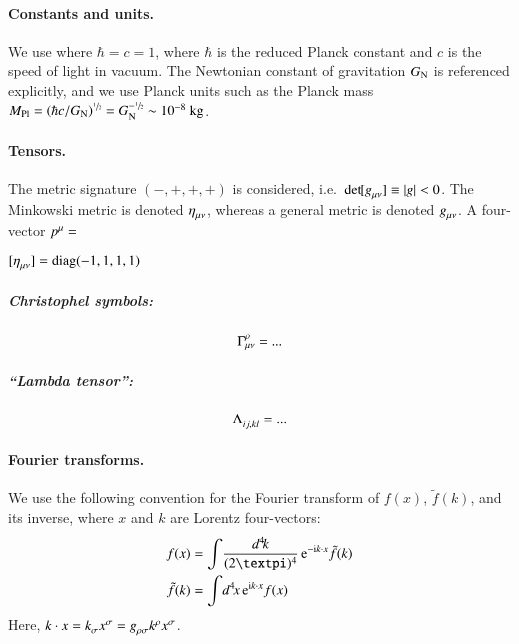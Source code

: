 


\paragraph{Constants and units.} %
We use  where $\hbar = c = 1$, where $\hbar$ is the reduced Planck constant and $c$ is the speed of light in vacuum. The Newtonian constant of gravitation $G_\mathrm{N}$ is referenced explicitly, and we use Planck units such as the Planck mass $M_{\mathrm{Pl}} = \left( \hbar c /G_\mathrm{N} \right)^{\sfrac{1}{2}} = G_\mathrm{N}^{-\sfrac{1}{2}} \sim 10^{-8} ~\mathrm{kg}$. 
%

\paragraph{Tensors.} %
The metric signature $(-,+,+,+)$ is considered, i.e.~$\det~\!\![g\indices{_{\mu\nu}}] \equiv \abs{g} < 0 $. The Minkowski metric is denoted $\eta\indices{_{\mu\nu}}$, whereas a general metric is denoted $g\indices{_{\mu\nu}}$. A four-vector $p\indices{^{\mu}} = $

$[\eta\loind{\mu\nu}] = \text{diag}(-1, 1, 1, 1)$

\subparagraph[Gamma]{Christophel symbols:} %
\begin{equation}
    \tensor*{\Gamma}{^\rho_{\mu \nu}} = ...
\end{equation}

\subparagraph[Lambda]{``Lambda tensor'':} %
\begin{equation}
    \tensor*{\Lambda}{_{ij, kl}} = ...
\end{equation}



\paragraph{Fourier transforms.} %
We use the following convention for the Fourier transform of $f(x)$, $\tilde{f}(k)$, and its inverse, where $x$ and $k$ are Lorentz four-vectors:
\begin{equation}
    \begin{split}
        f(x) &= \int \! \frac{d^4\! k}{(2\ppi)^4} \, \eu[-\im k\cdot x] \tilde{f}(k) \\
        \tilde{f}(k) &= \int \! d^4\! x \, \eu[\im k \cdot x] f(x) 
    \end{split}
\end{equation}
Here, $k\cdot x = k\loind{\sigma} x\upind{\sigma} = g\loind{\rho\sigma} k\upind{\rho} x\upind{\sigma}$.


